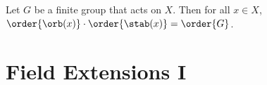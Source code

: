 \documentclass{article}
\begin{document}
\begin{ttheorem}
  Let \( G \) be a finite group that acts on \( X \). Then for all \( x\in X \), \( \order{\orb(x)} \cdot \order{\stab(x)} = \order{G} \).
\end{ttheorem}


\section{Field Extensions I}




\end{document}
